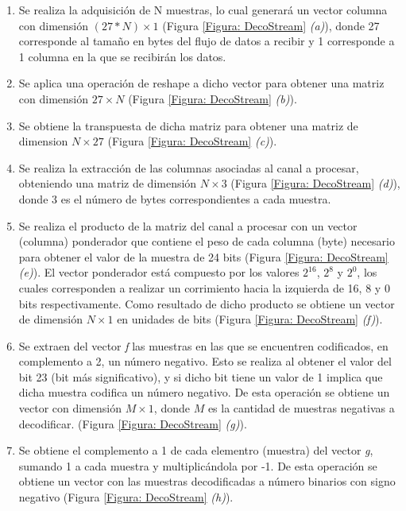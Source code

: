 \begin{enumerate}
	\item Se realiza la adquisición de N muestras, lo cual generará un vector columna con dimensión $(27*N)\times 1$ (Figura \ref{Figura: DecoStream} \emph{(a)}), donde 27 corresponde al tamaño en bytes del flujo de datos a recibir y 1 corresponde a 1 columna en la que se recibirán los datos.
	
	\item Se aplica una operación de reshape a dicho vector para obtener una matriz con dimensión $27\times N$ (Figura \ref{Figura: DecoStream} \emph{(b)}).
	
	\item Se obtiene la transpuesta de dicha matriz para obtener una matriz de dimension $N\times 27$ (Figura \ref{Figura: DecoStream} \emph{(c)}).
	
	\item Se realiza la extracción de las columnas asociadas al canal a procesar, obteniendo una matriz de dimensión $N\times 3$ (Figura \ref{Figura: DecoStream} \emph{(d)}), donde 3 es el número de bytes correspondientes a cada muestra.
	
	\item Se realiza el producto de la matriz del canal a procesar con un vector (columna) ponderador que contiene el peso de cada columna (byte) necesario para obtener el valor de la muestra de 24 bits (Figura \ref{Figura: DecoStream} \emph{(e)}). El vector ponderador está compuesto por los valores $2^{16}$, $2^8$ y $2^0$, los cuales corresponden a realizar un corrimiento hacia la izquierda de 16, 8 y 0 bits respectivamente. Como resultado de dicho producto se obtiene un vector de dimensión $N\times 1$ en unidades de bits (Figura \ref{Figura: DecoStream} \emph{(f)}).
	
	\item Se extraen del vector \emph{f} las muestras en las que se encuentren codificados, en complemento a 2, un número negativo. Esto se realiza al obtener el valor del bit 23 (bit más significativo), y si dicho bit tiene un valor de 1 implica que dicha muestra codifica un número negativo. De esta operación se obtiene un vector con dimensión $M\times 1$, donde $M$ es la cantidad de muestras negativas a decodificar. (Figura \ref{Figura: DecoStream} \emph{(g)}).
	
	\item Se obtiene el complemento a 1 de cada elementro (muestra) del vector \emph{g}, sumando 1 a cada muestra y multiplicándola por -1. De esta operación se obtiene un vector con las muestras decodificadas a número binarios con signo negativo (Figura \ref{Figura: DecoStream} \emph{(h)}).
	

\end{enumerate}
